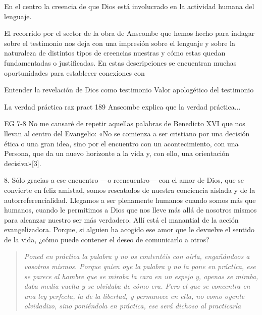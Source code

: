 En el centro
la creencia de que Dios está involucrado en la actividad humana del lenguaje.



El recorrido por el sector de la obra de Anscombe que hemos hecho para indagar sobre el testimonio nos deja con una impresión sobre el lenguaje y sobre la naturaleza de distintos tipos de creencias nuestras y cómo estas quedan fundamentadas o justificadas. En estas descripciones se encuentran muchas oportunidades para establecer conexiones con

Entender la revelación de Dios como testimonio
Valor apologético del testimonio

La verdad práctica raz pract 189
Anscombe explica que la verdad práctica...

EG 7-8
No me cansaré de repetir aquellas palabras de Benedicto XVI que nos llevan al centro del Evangelio: «No se comienza a ser cristiano por una decisión ética o una gran idea, sino por el encuentro con un acontecimiento, con una Persona, que da un nuevo horizonte a la vida y, con ello, una orientación decisiva»[3].

8. Sólo gracias a ese encuentro —o reencuentro— con el amor de Dios, que se convierte en feliz amistad, somos rescatados de nuestra conciencia aislada y de la autorreferencialidad. Llegamos a ser plenamente humanos cuando somos más que humanos, cuando le permitimos a Dios que nos lleve más allá de nosotros mismos para alcanzar nuestro ser más verdadero. Allí está el manantial de la acción evangelizadora. Porque, si alguien ha acogido ese amor que le devuelve el sentido de la vida, ¿cómo puede contener el deseo de comunicarlo a otros?


\blockquote[][\,(St 1, 22-25)]{\emph{Poned en práctica la palabra y no os contentéis con oírla, engañándoos a vosotros mismos. Porque quien oye la palabra y no la pone en práctica, ese se parece al hombre que se miraba la cara en un espejo y, apenas se miraba, daba media vuelta y se olvidaba de cómo era. Pero el que se concentra en una ley perfecta, la de la libertad, y permanece en ella, no como oyente olvidadizo, sino poniéndola en práctica, ese será dichoso al practicarla}}.
